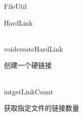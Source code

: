 \begin{XeClass}{FileUtil}
\begin{XeInnerClass}{HardLink}
    \begin{XeMethod}{\XePublic\\ }{void}{createHardLink}
         
 创建一个硬链接

    \end{XeMethod}

    \begin{XeMethod}{\XePublic\\ }{int}{getLinkCount}
         
 获取指定文件的链接数量

    \end{XeMethod}

  \end{XeInnerClass}
\end{XeClass}
